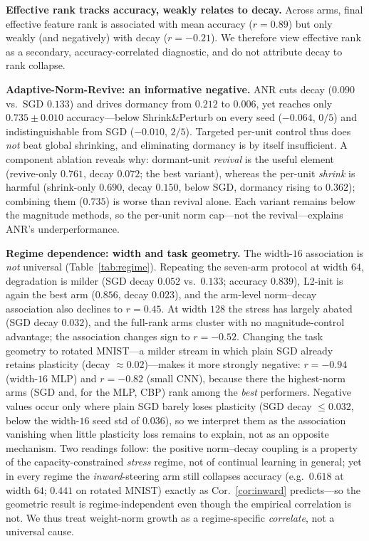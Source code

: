 \documentclass[conference]{IEEEtran}
\begin{document}
\textbf{Effective rank tracks accuracy, weakly relates to decay.} Across arms,
final effective feature rank is associated with mean accuracy
($r{=}0.89$) but only weakly (and negatively) with decay ($r{=}-0.21$). We
therefore view effective rank as a secondary, accuracy-correlated diagnostic, and
do not attribute decay to rank collapse.

\textbf{Adaptive-Norm-Revive: an informative negative.} ANR cuts decay
($0.090$ vs.\ SGD $0.133$) and drives dormancy from $0.212$ to $0.006$, yet reaches
only $0.735\pm0.010$ accuracy---below Shrink\&Perturb on every seed ($-0.064$, $0/5$)
and indistinguishable from SGD ($-0.010$, $2/5$). Targeted per-unit control thus does
\emph{not} beat global shrinking, and eliminating dormancy is by itself insufficient.
A component ablation reveals why: dormant-unit \emph{revival} is the useful element
(revive-only $0.761$, decay $0.072$; the best variant), whereas the per-unit
\emph{shrink} is harmful (shrink-only $0.690$, decay $0.150$, below SGD, dormancy
rising to $0.362$); combining them ($0.735$) is worse than revival alone. Each variant remains below the magnitude methods, so the
per-unit norm cap---not the revival---explains ANR's underperformance.

\textbf{Regime dependence: width and task geometry.} The width-$16$ association is
\emph{not} universal (Table~\ref{tab:regime}). Repeating the seven-arm protocol at
width $64$, degradation is milder (SGD decay $0.052$ vs.\ $0.133$; accuracy
$0.839$), L2-init is again the best arm ($0.856$, decay $0.023$), and the arm-level
norm--decay association also declines to $r{=}0.45$. At width $128$ the stress has
largely abated (SGD decay $0.032$), and the full-rank arms cluster with no
magnitude-control advantage; the association {changes sign} to $r{=}-0.52$.
Changing the task geometry to rotated MNIST---a milder stream in which plain SGD
already retains plasticity (decay $\approx0.02$)---{makes it more strongly
negative}:
$r{=}-0.94$ (width-$16$ MLP) and $r{=}-0.82$ (small CNN), because there the
highest-norm arms {(SGD and, for the MLP, CBP)} rank among the \emph{best} performers. {Negative
values occur only where plain SGD barely loses plasticity (SGD decay ${\le}0.032$,
below the width-$16$ seed std of $0.036$), so we interpret them as the association
vanishing when little plasticity loss remains to explain, not as an opposite
mechanism.} Two readings
follow: the positive norm--decay coupling is a property of the capacity-constrained
\emph{stress} regime, not of continual learning in general; yet in every regime the
\emph{inward}-steering arm still collapses accuracy (e.g.\ $0.618$ at width $64$;
$0.441$ on rotated MNIST) exactly as Cor.~\ref{cor:inward} predicts---so the
geometric result is regime-independent even though the empirical correlation is not.
We thus treat weight-norm growth as a regime-specific \emph{correlate}, not a
universal cause.
\end{document}
